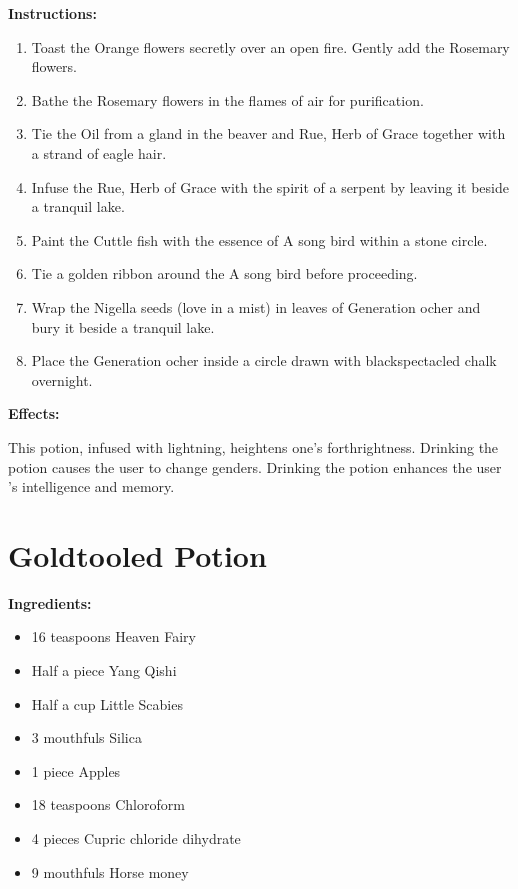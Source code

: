 \documentclass{article}
\begin{document}
\textbf{Instructions:}

\begin{enumerate}
  \item Toast the Orange flowers secretly over an open fire. Gently add the Rosemary flowers.
  \item Bathe the Rosemary flowers in the flames of air for purification.
  \item Tie the Oil from a gland in the beaver and Rue, Herb of Grace together with a strand of eagle hair.
  \item Infuse the Rue, Herb of Grace with the spirit of a serpent by leaving it beside a tranquil lake.
  \item Paint the Cuttle fish with the essence of A song bird within a stone circle.
  \item Tie a golden ribbon around the A song bird before proceeding.
  \item Wrap the Nigella seeds (love in a mist) in leaves of Generation ocher and bury it beside a tranquil lake.
  \item Place the Generation ocher inside a circle drawn with blackspectacled chalk overnight.
\end{enumerate}

\textbf{Effects:}

This potion, infused with lightning, heightens one's forthrightness. Drinking the potion causes the user to change genders. Drinking the potion enhances the user 's intelligence and memory.

\newpage
\section*{Goldtooled Potion}

\textbf{Ingredients:}

\begin{itemize}
  \item 16 teaspoons Heaven Fairy
  \item Half a piece Yang Qishi
  \item Half a cup Little Scabies
  \item 3 mouthfuls Silica
  \item 1 piece Apples
  \item 18 teaspoons Chloroform
  \item 4 pieces Cupric chloride dihydrate
  \item 9 mouthfuls Horse money
\end{itemize}
\end{document}
